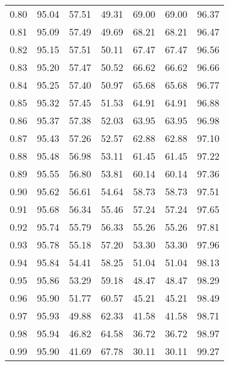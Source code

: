 \begin{tabular}{|c|c|c|c|c|c|c|}
      0.80 &     95.04 &     57.51 &      49.31 &   69.00 &      69.00 &         96.37 \\
      0.81 &     95.09 &     57.49 &      49.69 &   68.21 &      68.21 &         96.47 \\
      0.82 &     95.15 &     57.51 &      50.11 &   67.47 &      67.47 &         96.56 \\
      0.83 &     95.20 &     57.47 &      50.52 &   66.62 &      66.62 &         96.66 \\
      0.84 &     95.25 &     57.40 &      50.97 &   65.68 &      65.68 &         96.77 \\
      0.85 &     95.32 &     57.45 &      51.53 &   64.91 &      64.91 &         96.88 \\
      0.86 &     95.37 &     57.38 &      52.03 &   63.95 &      63.95 &         96.98 \\
      0.87 &     95.43 &     57.26 &      52.57 &   62.88 &      62.88 &         97.10 \\
      0.88 &     95.48 &     56.98 &      53.11 &   61.45 &      61.45 &         97.22 \\
      0.89 &     95.55 &     56.80 &      53.81 &   60.14 &      60.14 &         97.36 \\
      0.90 &     95.62 &     56.61 &      54.64 &   58.73 &      58.73 &         97.51 \\
      0.91 &     95.68 &     56.34 &      55.46 &   57.24 &      57.24 &         97.65 \\
      0.92 &     95.74 &     55.79 &      56.33 &   55.26 &      55.26 &         97.81 \\
      0.93 &     95.78 &     55.18 &      57.20 &   53.30 &      53.30 &         97.96 \\
      0.94 &     95.84 &     54.41 &      58.25 &   51.04 &      51.04 &         98.13 \\
      0.95 &     95.86 &     53.29 &      59.18 &   48.47 &      48.47 &         98.29 \\
      0.96 &     95.90 &     51.77 &      60.57 &   45.21 &      45.21 &         98.49 \\
      0.97 &     95.93 &     49.88 &      62.33 &   41.58 &      41.58 &         98.71 \\
      0.98 &     95.94 &     46.82 &      64.58 &   36.72 &      36.72 &         98.97 \\
      0.99 &     95.90 &     41.69 &      67.78 &   30.11 &      30.11 &         99.27 \\
\bottomrule
\end{tabular}
